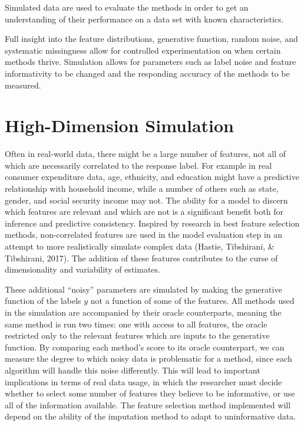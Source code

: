\documentclass[12pt,twoside]{reedthesis}
\begin{document}
Simulated data are used to evaluate the methods in order to get an
understanding of their performance on a data set with known
characteristics.

Full insight into the feature distributions, generative function, random
noise, and systematic missingness allow for controlled experimentation
on when certain methods thrive. Simulation allows for parameters such as
label noise and feature informativity to be changed and the responding
accuracy of the methods to be measured.

\section{High-Dimension Simulation}\label{high-dimension-simulation}

Often in real-world data, there might be a large number of features, not
all of which are necessarily correlated to the response label. For
example in real consumer expenditure data, age, ethnicity, and education
might have a predictive relationship with household income, while a
number of others such as state, gender, and social security income may
not. The ability for a model to discern which features are relevant and
which are not is a significant benefit both for inference and predictive
consistency. Inspired by research in best feature selection methods,
non-correlated features are used in the model evaluation step in an
attempt to more realistically simulate complex data (Hastie, Tibshirani,
\& Tibshirani, 2017). The addition of these features contributes to the
curse of dimensionality and variability of estimates.

These additional ``noisy'' parameters are simulated by making the
generative function of the labels \(y\) not a function of some of the
features. All methods used in the simulation are accompanied by their
oracle counterparts, meaning the same method is run two times: one with
access to all features, the oracle restricted only to the relevant
features which are inputs to the generative function. By comparing each
method's score to its oracle counterpart, we can measure the degree to
which noisy data is problematic for a method, since each algorithm will
handle this noise differently. This will lead to important implications
in terms of real data usage, in which the researcher must decide whether
to select some number of features they believe to be informative, or use
all of the information available. The feature selection method
implemented will depend on the ability of the imputation method to adapt
to uninformative data.
\end{document}
